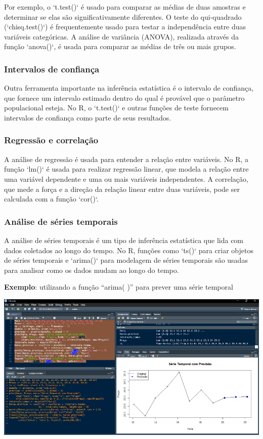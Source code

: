 \documentclass[
]{book}
\begin{document}
Por exemplo, o `t.test()` é usado para comparar as médias de duas amostras e determinar se elas são significativamente diferentes. O teste do qui-quadrado (`chisq.test()`) é frequentemente usado para testar a independência entre duas variáveis categóricas. A análise de variância (ANOVA), realizada através da função `anova()`, é usada para comparar as médias de três ou mais grupos.

\subsubsection{Intervalos de confiança}\label{intervalos-de-confianuxe7a}

Outra ferramenta importante na inferência estatística é o intervalo de confiança, que fornece um intervalo estimado dentro do qual é provável que o parâmetro populacional esteja. No R, o `t.test()` e outras funções de teste fornecem intervalos de confiança como parte de seus resultados.

\subsubsection{Regressão e correlação}\label{regressuxe3o-e-correlauxe7uxe3o}

A análise de regressão é usada para entender a relação entre variáveis. No R, a função `lm()` é usada para realizar regressão linear, que modela a relação entre uma variável dependente e uma ou mais variáveis independentes. A correlação, que mede a força e a direção da relação linear entre duas variáveis, pode ser calculada com a função `cor()`.

\subsubsection{Análise de séries temporais}\label{anuxe1lise-de-suxe9ries-temporais}

A análise de séries temporais é um tipo de inferência estatística que lida com dados coletados ao longo do tempo. No R, funções como `ts()` para criar objetos de séries temporais e `arima()` para modelagem de séries temporais são usadas para analisar como os dados mudam ao longo do tempo.

\textbf{Exemplo}: utilizando a função ``arima( )'' para prever uma série temporal

\includegraphics{images/clipboard-3461101962.png}
\end{document}
